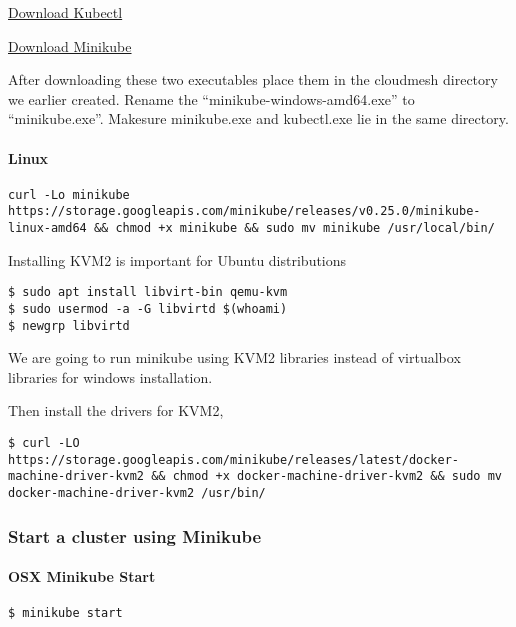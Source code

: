 \href{http://storage.googleapis.com/kubernetes-release/release/v1.4.0/bin/windows/amd64/kubectl.exe}{Download
Kubectl}

\href{https://storage.googleapis.com/minikube/releases/v0.25.0/minikube-windows-amd64.exe}{Download
Minikube}

After downloading these two executables place them in the cloudmesh
directory we earlier created. Rename the ``minikube-windows-amd64.exe''
to ``minikube.exe''. Makesure minikube.exe and kubectl.exe lie in the
same directory.

\paragraph{Linux}\label{linux}

\begin{verbatim}
curl -Lo minikube https://storage.googleapis.com/minikube/releases/v0.25.0/minikube-linux-amd64 && chmod +x minikube && sudo mv minikube /usr/local/bin/
\end{verbatim}

Installing KVM2 is important for Ubuntu distributions

\begin{verbatim}
$ sudo apt install libvirt-bin qemu-kvm
$ sudo usermod -a -G libvirtd $(whoami)
$ newgrp libvirtd
\end{verbatim}

We are going to run minikube using KVM2 libraries instead of virtualbox
libraries for windows installation.

Then install the drivers for KVM2,

\begin{verbatim}
$ curl -LO https://storage.googleapis.com/minikube/releases/latest/docker-machine-driver-kvm2 && chmod +x docker-machine-driver-kvm2 && sudo mv docker-machine-driver-kvm2 /usr/bin/
\end{verbatim}

\subsubsection{Start a cluster using
Minikube}\label{start-a-cluster-using-minikube}

\paragraph{OSX Minikube Start}\label{osx-minikube-start}

\begin{verbatim}
$ minikube start
\end{verbatim}


